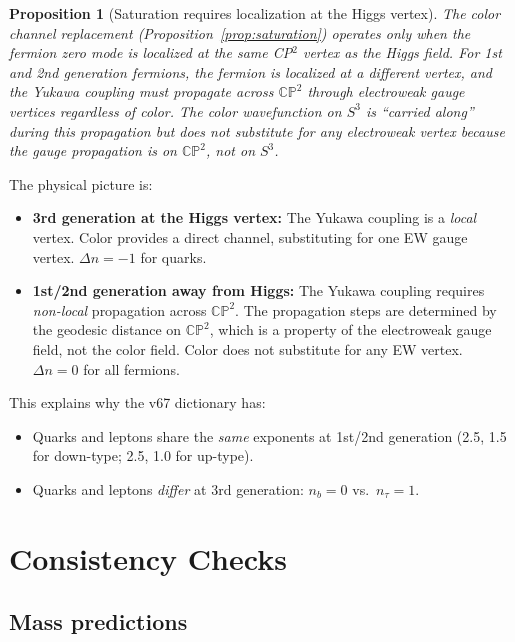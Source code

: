 \documentclass[11pt,a4paper]{article}
\newcommand{\CP}{\mathbb{CP}}
\newtheorem{proposition}[theorem]{Proposition}
\theoremstyle{definition}
\theoremstyle{remark}
\begin{document}
\begin{proposition}[Saturation requires localization at the Higgs vertex]
\label{prop:localization}
The color channel replacement (Proposition~\ref{prop:saturation})
operates only when the fermion zero mode is localized at the same
CP$^2$ vertex as the Higgs field.  For 1st and 2nd generation fermions,
the fermion is localized at a \emph{different} vertex, and the Yukawa
coupling must propagate across $\CP^2$ through electroweak gauge
vertices regardless of color.  The color wavefunction on $S^3$ is
``carried along'' during this propagation but does not substitute for
any electroweak vertex because the gauge propagation is on $\CP^2$,
not on $S^3$.
\end{proposition}

The physical picture is:
\begin{itemize}
\item \textbf{3rd generation at the Higgs vertex:} The Yukawa coupling
is a \emph{local} vertex.  Color provides a direct channel, substituting
for one EW gauge vertex.  $\Delta n = -1$ for quarks.

\item \textbf{1st/2nd generation away from Higgs:} The Yukawa coupling
requires \emph{non-local} propagation across $\CP^2$.  The propagation
steps are determined by the geodesic distance on $\CP^2$, which is a
property of the electroweak gauge field, not the color field.  Color
does not substitute for any EW vertex.  $\Delta n = 0$ for all fermions.
\end{itemize}

This explains why the v67 dictionary has:
\begin{itemize}
\item Quarks and leptons share the \emph{same} exponents at 1st/2nd
generation (2.5, 1.5 for down-type; 2.5, 1.0 for up-type).
\item Quarks and leptons \emph{differ} at 3rd generation: $n_b = 0$
vs.\ $n_\tau = 1$.
\end{itemize}

\section{Consistency Checks}
\label{sec:checks}

\subsection{Mass predictions}
\end{document}
